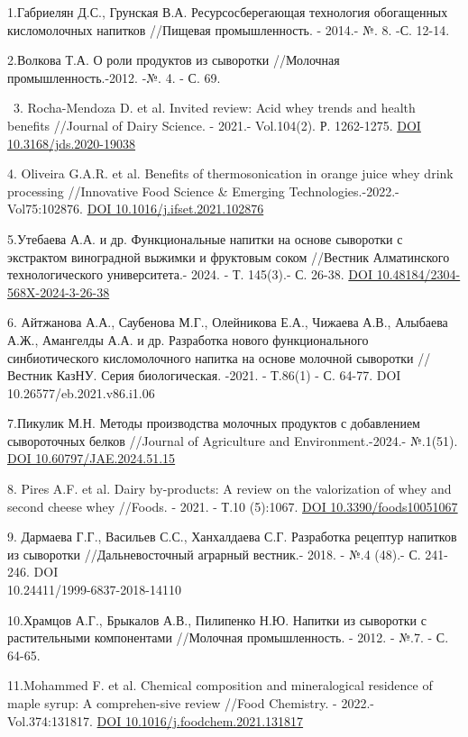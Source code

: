 \begin{references}
1.Габриелян Д.С., Грунская В.А. Ресурсосберегающая технология
обогащенных кисломолочных напитков //Пищевая промышленность. - 2014.- №.
8. -С. 12-14.

2.Волкова Т.А. О роли продуктов из сыворотки //Молочная
промышленность.-2012. -№. 4. - С. 69.

~3. Rocha-Mendoza D. et al. Invited review: Acid whey trends and health
benefits //Journal of Dairy Science. - 2021.- Vol.104(2). Р. 1262-1275.
\href{https://doi.org/10.3168/jds.2020-19038}{DOI
10.3168/jds.2020-19038}

4. Oliveira G.A.R. et al. Benefits of thermosonication in orange juice
whey drink processing //Innovative Food Science \& Emerging
Technologies.-2022.- Vol75:102876.
\href{https://doi.org/10.1016/j.ifset.2021.102876}{DOI
10.1016/j.ifset.2021.102876}

5.Утебаева А.А. и др. Функциональные напитки на основе сыворотки с
экстрактом виноградной выжимки и фруктовым соком //Вестник Алматинского
технологического университета.- 2024. - Т. 145(3).- С. 26-38.
\href{https://doi.org/10.48184/2304-568X-2024-3-26-38}{DOI
10.48184/2304-568X-2024-3-26-38}

6. Айтжанова А.А., Саубенова М.Г., Олейникова Е.А., Чижаева А.В.,
Алыбаева А.Ж., Амангелды А.А. и др. Разработка нового функционального
синбиотического кисломолочного напитка на основе молочной сыворотки
//Вестник КазНУ. Серия биологическая. -2021. - Т.86(1) - С. 64-77. DOI
10.26577/eb.2021.v86.i1.06

7.Пикулик М.Н. Методы производства молочных продуктов с добавлением
сывороточных белков //Journal of Agriculture and Environment.-2024.-
№.1(51).
\href{https://doi.org/10.60797/JAE.2024.51.15}{DOI
10.60797/JAE.2024.51.15}

8. Pires A.F. et al. Dairy by-products: A review on the valorization of
whey and second cheese whey //Foods. - 2021. - Т.10 (5):1067.
\href{https://doi.org/10.3390/foods10051067}{DOI 10.3390/foods10051067}

9. Дармаева Г.Г., Васильев С.С., Ханхалдаева С.Г. Разработка рецептур
напитков из сыворотки //Дальневосточный аграрный вестник.- 2018. - №.4
(48).- С. 241-246. DOI \\10.24411/1999-6837-2018-14110

10.Храмцов А.Г., Брыкалов А.В., Пилипенко Н.Ю. Напитки из сыворотки с
растительными компонентами //Молочная промышленность. - 2012. - №.7. -
С. 64-65.

11.Mohammed F. et al. Chemical composition and mineralogical residence
of maple syrup: A comprehen-sive review //Food Chemistry. - 2022.-
Vol.374:131817.
\href{https://doi.org/10.1016/j.foodchem.2021.131817}{DOI
10.1016/j.foodchem.2021.131817}


\end{references}
